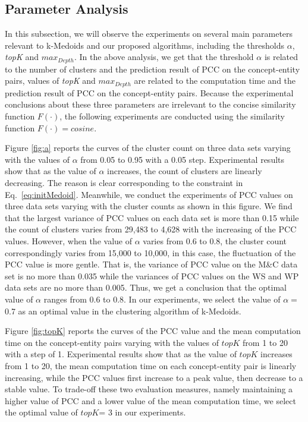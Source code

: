 \subsection{Parameter Analysis}
In this subsection, we will observe the experiments on several main parameters relevant to k-Medoids and our proposed algorithms, including the thresholds $\alpha$, \emph{topK} and $max_{Depth}$.
In the above analysis, we get that the threshold $\alpha$ is related to the number of clusters and the prediction result of PCC on the concept-entity pairs, values of \emph{topK} and $max_{Depth}$ are related to the computation time and the prediction result of PCC on the concept-entity pairs. Because the experimental conclusions about these three parameters are irrelevant to the concise similarity function $F(\cdot)$, the following experiments are conducted using the similarity function $F(\cdot)=cosine$.

Figure \ref{fig:a} reports the curves of the cluster count on three data sets varying with the values of $\alpha$ from 0.05 to 0.95 with a 0.05 step. Experimental results show that as the value of $\alpha$ increases, the count of clusters are linearly decreasing. The reason is clear corresponding to the constraint in Eq.~\ref{eq:initMedoid}. Meanwhile, we conduct the experiments of PCC values on three data sets varying with the cluster counts as shown in this figure. We find that the largest variance of PCC values on each data set is more than 0.15 while the count of clusters varies from 29,483 to 4,628 with the increasing of the PCC values. However, when the value of $\alpha$ varies from 0.6 to 0.8, the cluster count correspondingly varies from 15,000 to 10,000, in this case, the fluctuation of the PCC value is more gentle. That is, the variance of PCC value on the M\&C data set is no more than 0.035 while the variances of PCC values on the WS and WP data sets are no more than 0.005. Thus, we get a conclusion that the optimal value of $\alpha$ ranges from 0.6 to 0.8. In our experiments, we select the value of $\alpha = $0.7 as an optimal value in the clustering algorithm of k-Medoids.

Figure \ref{fig:topK} reports the curves of the PCC value and the mean computation time on the concept-entity pairs varying with the values of $topK$ from 1 to 20 with a step of 1. Experimental results show that as the value of $topK$ increases from 1 to 20, the mean computation time on each concept-entity pair is linearly increasing, while the PCC values first increase to a peak value, then decrease to a stable value. To trade-off these two evaluation measures, namely maintaining a higher value of PCC and a lower value of the mean computation time, we select the optimal value of $topK $= 3 in our experiments.

